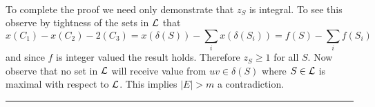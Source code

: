\documentclass[letterpaper,12pt,oneside,onecolumn]{article}
\newenvironment{proof}{{\bf Proof:  }}{\hfill\rule{2mm}{2mm}}
\begin{document}
\begin{proof}
\paragraph{}
To complete the proof we need only demonstrate that $z_S$ is integral. To see this observe by tightness of the sets in $\mathcal{L}$ that
$$x(C_1) -x(C_2) -2(C_3) = x(\delta(S)) - \sum_i x(\delta(S_i)) = f(S) - \sum_i f(S_i)$$
and since $f$ is integer valued the result holds. Therefore $z_S \geq 1$ for all $S$. Now observe that no set in $\mathcal{L}$ will receive value from $uv \in \delta(S)$ where $S\in \mathcal{L}$ is maximal with respect to $\mathcal{L}$. This implies $|E| > m$ a contradiction.
\end{proof}
\end{document}
